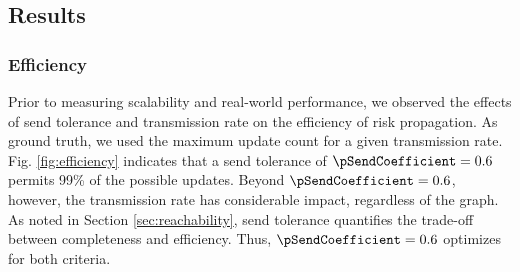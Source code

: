 \subsection{Results}

\subsubsection{Efficiency}

Prior to measuring scalability and real-world performance, we observed the effects of send tolerance and transmission rate on the efficiency of risk propagation. As ground truth, we used the maximum update count for a given transmission rate. Fig. \ref{fig:efficiency} indicates that a send tolerance of $\pSendCoefficient = 0.6$ permits 99\% of the possible updates. Beyond $\pSendCoefficient = 0.6$, however, the transmission rate has considerable impact, regardless of the graph. As noted in Section \ref{sec:reachability}, send tolerance quantifies the trade-off between completeness and efficiency. Thus, $\pSendCoefficient = 0.6$ optimizes for both criteria.

